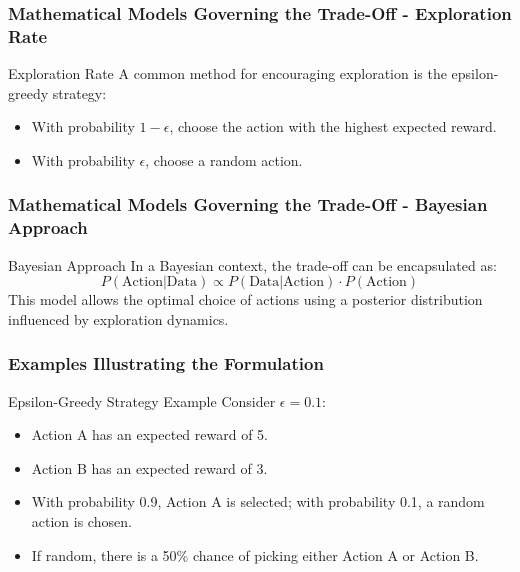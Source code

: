 \documentclass[aspectratio=169]{beamer}
\begin{document}
\begin{frame}[fragile]
    \frametitle{Mathematical Models Governing the Trade-Off - Exploration Rate}
    \begin{block}{Exploration Rate}
        A common method for encouraging exploration is the epsilon-greedy strategy:
        \begin{itemize}
            \item With probability \( 1 - \epsilon \), choose the action with the highest expected reward.
            \item With probability \( \epsilon \), choose a random action.
        \end{itemize}
    \end{block}
\end{frame}

\begin{frame}[fragile]
    \frametitle{Mathematical Models Governing the Trade-Off - Bayesian Approach}
    \begin{block}{Bayesian Approach}
        In a Bayesian context, the trade-off can be encapsulated as:
        \begin{equation}
            P(\text{Action} | \text{Data}) \propto P(\text{Data} | \text{Action}) \cdot P(\text{Action})
        \end{equation}
        This model allows the optimal choice of actions using a posterior distribution influenced by exploration dynamics.
    \end{block}
\end{frame}

\begin{frame}[fragile]
    \frametitle{Examples Illustrating the Formulation}
    \begin{block}{Epsilon-Greedy Strategy Example}
        Consider \( \epsilon = 0.1 \):
        \begin{itemize}
            \item Action A has an expected reward of 5.
            \item Action B has an expected reward of 3.
            \item With probability 0.9, Action A is selected; with probability 0.1, a random action is chosen.
            \item If random, there is a 50\% chance of picking either Action A or Action B.
        \end{itemize}
    \end{block}
\end{frame}
\end{document}
